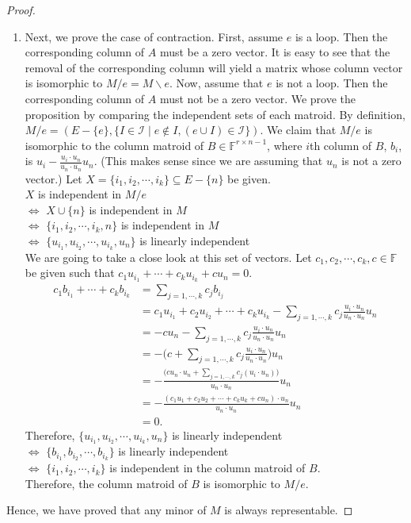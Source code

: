 \begin{proof}
\begin{enumerate}
\item
  Next, we prove the case of contraction.
  First, assume $e$ is a loop.
  Then the corresponding column of $A$ must be a zero vector.
  It is easy to see that the removal of the corresponding column will yield a matrix whose column vector is isomorphic to $M / e = M \backslash e$.
  Now, assume that $e$ is not a loop.
  Then the corresponding column of $A$ must not be a zero vector.
  We prove the proposition by comparing the independent sets of each matroid.
  By definition, $M / e = (E - \{ e \}, \{ I \in \mathcal{I} \mid e \notin I, (e \cup I) \in \mathcal{I}\})$.
  We claim that $M / e$ is isomorphic to the column matroid of $B \in \mathbb{F}^{r \times n-1}$, 
  where $i$th column of $B$, $b_i$, is $\displaystyle u_i - \frac{u_i \cdot u_n}{u_n \cdot u_n} u_n$.
  (This makes sense since we are assuming that $u_n$ is not a zero vector.)
  Let $X = \{ i_1, i_2, \cdots, i_k \} \subseteq E - \{ n \}$ be given. \\
  $X$ is independent in $M / e$ \\
  $\iff$ $X \cup \{ n \}$ is independent in $M$ \\
  $\iff$ $\{ i_1, i_2, \cdots, i_k, n \}$ is independent in $M$ \\
  $\iff$ $\{ u_{i_1}, u_{i_2}, \cdots, u_{i_k}, u_{n} \}$ is linearly independent \\
  We are going to take a close look at this set of vectors.
  Let $c_1, c_2, \cdots, c_k, c \in \mathbb{F}$ be given such that $c_1 u_{i_1} + \cdots + c_k u_{i_k} + c u_n = 0$.\\
  \begin{align*}\displaystyle c_1 b_{i_1} + \cdots + c_k b_{i_k}
  &= \sum_{j=1,\cdots,k} c_j b_{i_j}  \\
  &= c_1 u_{i_1} + c_2 u_{i_2} + \cdots + c_k u_{i_k} - \sum_{j=1,\cdots,k} c_j \frac{u_i \cdot u_n}{u_n \cdot u_n} u_n  \\
  &= -c u_n - \sum_{j=1,\cdots,k} c_j \frac{u_i \cdot u_n}{u_n \cdot u_n} u_n \\
  &= -\Big(c + \sum_{j=1,\cdots,k} c_j \frac{u_i \cdot u_n}{u_n \cdot u_n}\Big)u_n \\
  &= -\frac{\Big(c{u_n \cdot u_n} + \sum_{j=1,\cdots,k} c_j (u_i \cdot u_n)\Big)}{u_n \cdot u_n}u_n \\
  &= -\frac{(c_1 u_1 + c_2 u_2 + \cdots + c_k u_k + c u_n) \cdot u_n}{u_n \cdot u_n}u_n \\
  &= 0.\end{align*}
  Therefore, $\{ u_{i_1}, u_{i_2}, \cdots, u_{i_k}, u_{n} \}$ is linearly independent \\
  $\iff$ $\{ b_{i_1}, b_{i_2}, \cdots, b_{i_k} \}$ is linearly independent \\
  $\iff$ $\{ i_1, i_2, \cdots, i_k \}$ is independent in the column matroid of $B$. \\
  Therefore, the column matroid of $B$ is isomorphic to $M / e$.
\end{enumerate}
Hence, we have proved that any minor of $M$ is always representable.
\end{proof}

